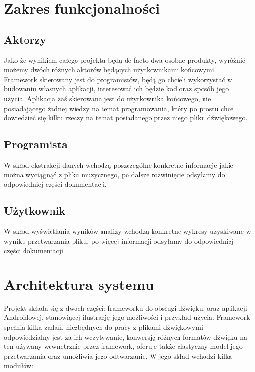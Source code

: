 \chapter{Zakres funkcjonalności}
\section{Aktorzy}
Jako że wynikiem całego projektu będą de facto dwa osobne produkty, wyróżnić możemy dwóch różnych aktorów będących użytkownikami końcowymi. Framework skierowany jest do programistów, będą go chcieli wykorzystać w budowaniu własnych aplikacji, interesować ich będzie kod oraz sposób jego użycia. Aplikacja zaś skierowana jest do użytkownika końcowego, nie posiadającego żadnej wiedzy na temat programowania, który po prostu chce dowiedzieć się kilku rzeczy na temat posiadanego przez niego pliku dźwiękowego.
\section{Programista}
W skład ekstrakcji danych wchodzą poszczególne konkretne informacje jakie można wyciągnąć z pliku muzycznego, po dalsze rozwinięcie odsyłamy do odpowiedniej części dokumentacji.
\section{Użytkownik}
W skład wyświetlania wyników analizy wchodzą konkretne wykresy uzyskiwane w wyniku przetwarzania pliku, po więcej informacji odsyłamy do odpowiedniej części dokumentacji
\chapter{Architektura systemu}

Projekt składa się z dwóch części: frameworku do obsługi dźwięku, oraz aplikacji Androidowej,
stanowiącej ilustrację jego możliwości i przykład użycia. Framework spełnia kilka zadań, niezbędnych
do pracy z plikami dźwiękowymi -- odpowiedzialny jest za ich wczytywanie, konwersję różnych formatów
dźwięku na ten używany wewnętrznie przez framework, oferuje także elastyczny model jego
przetwarzania oraz umożliwia jego odtwarzanie. W jego skład wchodzi kilka modułów:

